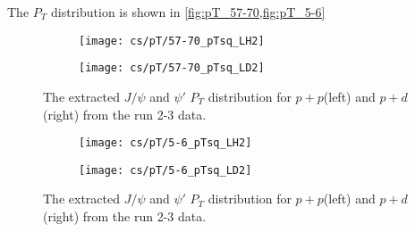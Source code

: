 \documentclass[../main.tex]{subfiles}
\begin{document}

The $P_T$ distribution is shown in \cref{fig:pT_57-70,fig:pT_5-6}
\begin{figure}
	\centering
	\begin{subfigure}{0.45\linewidth}
		\texttt{[image: cs/pT/57-70\_pTsq\_LH2]}
	\end{subfigure}
	\begin{subfigure}{0.45\linewidth}
		\texttt{[image: cs/pT/57-70\_pTsq\_LD2]}
	\end{subfigure}
	\caption{The extracted $J/\psi$ and $\psi'$ $P_T$ distribution for $p+p$(left)
	and $p+d$(right) from the run 2-3 data.}
	\label{fig:pT_57-70}
\end{figure}
\begin{figure}
	\centering
	\begin{subfigure}{0.45\linewidth}
		\texttt{[image: cs/pT/5-6\_pTsq\_LH2]}
	\end{subfigure}
	\begin{subfigure}{0.45\linewidth}
		\texttt{[image: cs/pT/5-6\_pTsq\_LD2]}
	\end{subfigure}
	\caption{The extracted $J/\psi$ and $\psi'$ $P_T$ distribution for $p+p$(left)
	and $p+d$(right) from the run 2-3 data.}
	\label{fig:pT_5-6}
\end{figure}
\end{document}
